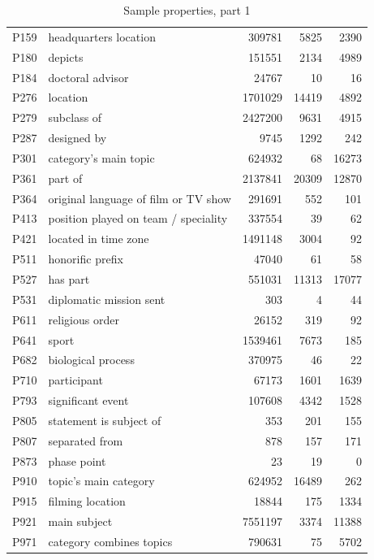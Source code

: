 \begin{table}[]
{\begin{tabular}{llrrr}
P159   & headquarters location   & 309781   & 5825   & 2390 \\
P180   & depicts   & 151551   & 2134   & 4989 \\
P184   & doctoral advisor   & 24767   & 10   & 16 \\
P276   & location   & 1701029   & 14419   & 4892 \\
P279   & subclass of   & 2427200   & 9631   & 4915 \\
P287   & designed by   & 9745   & 1292   & 242 \\
P301   & category's main topic   & 624932   & 68   & 16273 \\
P361   & part of   & 2137841   & 20309   & 12870 \\
P364   & original language of film or TV show   & 291691   & 552   & 101 \\
P413   & position played on team / speciality   & 337554   & 39   & 62 \\
P421   & located in time zone   & 1491148   & 3004   & 92 \\
P511   & honorific prefix   & 47040   & 61   & 58 \\
P527   & has part   & 551031   & 11313   & 17077 \\
P531   & diplomatic mission sent   & 303   & 4   & 44 \\
P611   & religious order   & 26152   & 319   & 92 \\
P641   & sport   & 1539461   & 7673   & 185 \\
P682   & biological process   & 370975   & 46   & 22 \\
P710   & participant   & 67173   & 1601   & 1639 \\
P793   & significant event   & 107608   & 4342   & 1528 \\
P805   & statement is subject of   & 353   & 201   & 155 \\
P807   & separated from   & 878   & 157   & 171 \\
P873   & phase point   & 23   & 19   & 0 \\
P910   & topic's main category   & 624952   & 16489   & 262 \\
P915   & filming location   & 18844   & 175   & 1334 \\
P921   & main subject   & 7551197   & 3374   & 11388 \\
P971   & category combines topics   & 790631   & 75   & 5702
\end{tabular}}
\caption{Sample properties, part 1}
\label{table:sampleProperties1}
\end{table}


